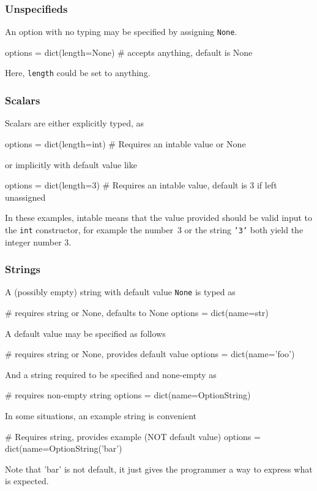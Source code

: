 \subsubsection{Unspecifieds}
An option with no typing may be specified by assigning \texttt{None}.
\begin{python}
  options = dict(length=None)
  # accepts anything, default is None
\end{python}
Here, \texttt{length} could be set to anything.



\subsubsection*{Scalars}
Scalars are either explicitly typed, as
\begin{python}
  options = dict(length=int)
  # Requires an intable value or None
\end{python}
or implicitly with default value like

\begin{python}
  options = dict(length=3)
  # Requires an intable value, default is 3 if left unassigned
\end{python}
In these examples, intable means that the value provided should be
valid input to the \texttt{int} constructor, for example the number~3
or the string \texttt{'3'} both yield the integer number 3.



\subsubsection*{Strings}
A (possibly empty) string with default value \texttt{None} is typed as
\begin{pythonBEG}
  # requires string or None, defaults to None
  options = dict(name=str)
\end{pythonBEG}
A default value may be specified as follows
\begin{pythonMID}
  # requires string or None, provides default value
  options = dict(name='foo')
\end{pythonMID}
And a string required to be specified and none-empty as
\begin{pythonMID}
  # requires non-empty string
  options = dict(name=OptionString)
\end{pythonMID}
In some situations, an example string is convenient
\begin{pythonEND}
  # Requires string, provides example (NOT default value)
  options = dict(name=OptionString('bar')
\end{pythonEND}
Note that 'bar' is not default, it just gives the programmer a way to
express what is expected.



